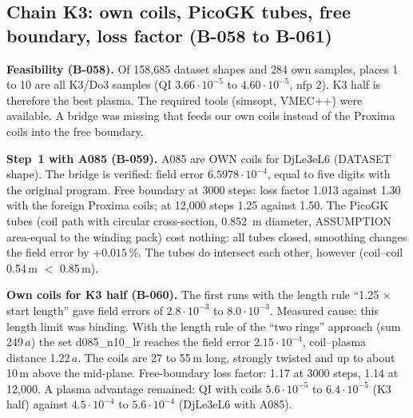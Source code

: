 \subsection{Chain K3: own coils, PicoGK tubes, free boundary, loss factor (B-058 to B-061)}
\textbf{Feasibility (B-058).} Of 158,685 dataset shapes and 284 own samples, places 1 to 10 are all K3/Do3 samples (QI $3.66\cdot10^{-5}$ to $4.60\cdot10^{-5}$, nfp 2).
K3 half is therefore the best plasma. The required tools (simsopt, VMEC++) were available. A bridge was missing that feeds our own coils instead of the Proxima coils into the free boundary.

\textbf{Step~1 with A085 (B-059).} A085 are OWN coils for DjLe3eL6 (DATASET shape). The bridge is verified: field error $6.5978\cdot10^{-4}$, equal to five digits with the original
program. Free boundary at 3000 steps: loss factor 1.013 against 1.30 with the foreign Proxima coils; at 12,000 steps 1.25 against 1.50. The PicoGK tubes (coil path with circular cross-section, \SI{0.852}{m}
diameter, ASSUMPTION area-equal to the winding pack) cost nothing: all tubes closed, smoothing changes the field error by $+0.015$\,\%. The tubes do intersect each other, however (coil--coil 0.54\,m $<$ 0.85\,m).

\textbf{Own coils for K3 half (B-060).} The first runs with the length rule ``1.25 $\times$ start length'' gave field errors of $2.8\cdot10^{-3}$ to $8.0\cdot10^{-3}$. Measured cause: this length limit was binding. With the length rule
of the ``two rings'' approach (sum 249\,$a$) the set d085\_n10\_lr reaches the field error $2.15\cdot10^{-4}$, coil--plasma distance 1.22\,$a$. The coils are 27 to 55\,m long, strongly twisted and up to about 10\,m above the mid-plane.
Free-boundary loss factor: 1.17 at 3000 steps, 1.14 at 12,000. A plasma advantage remained: QI with coils $5.6\cdot10^{-5}$ to $6.4\cdot10^{-5}$ (K3 half) against $4.5\cdot10^{-4}$ to $5.6\cdot10^{-4}$ (DjLe3eL6 with A085).

